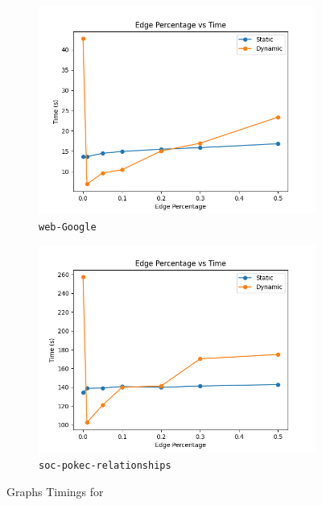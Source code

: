 \begin{figure}[h!]
\begin{subfigure}{0.3\textwidth}
        \includegraphics[width=\linewidth]{./Figures/web-Google.out.png}
        \caption{\texttt{web-Google}}
    \end{subfigure}
    \vspace{0.5cm}
    
    \begin{subfigure}{0.3\textwidth}
        \centering
        \includegraphics[width=\linewidth]{./Figures/big.png}
        \caption{\texttt{soc-pokec-relationships}}
    \end{subfigure}
    \hfill
    \caption{Graphs Timings for \tableref{\ref{tab:graph_details}}}
    \label{fig:seven_images}
\end{figure}



